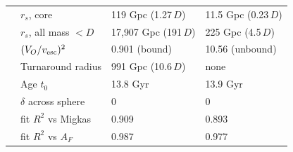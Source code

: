 \documentclass[10pt,letterpaper]{article}
\begin{document}
\begin{minipage}[t]{0.48\textwidth}
\begin{tabular}{llll}
 & $r_s$, core & 119 Gpc (1.27\,$D$) & 11.5 Gpc (0.23\,$D$)\\
 & $r_s$, all mass $<D$ & 17{,}907 Gpc (191\,$D$) & 225 Gpc (4.5\,$D$)\\
\midrule
 & $(V_O/v_{\rm esc})^2$ & 0.901 (bound) & 10.56 (unbound)\\
 & Turnaround radius & 991 Gpc (10.6\,$D$) & none\\
 & Age $t_0$ & 13.8 Gyr & 13.9 Gyr\\
 & $\delta$ across sphere & 0 & 0\\
 & fit $R^2$ vs Migkas & 0.909 & 0.893\\
 & fit $R^2$ vs $A_F$ & 0.987 & 0.977\\
\bottomrule
\end{tabular}
\end{minipage}
\par\vspace{6pt}
\end{document}
